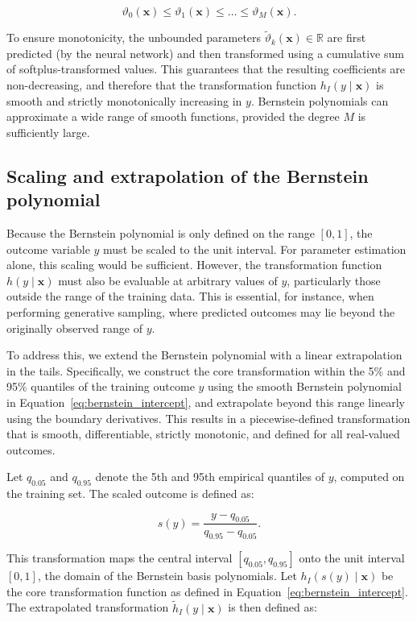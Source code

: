 \[
\vartheta_0(\mathbf{x}) \leq \vartheta_1(\mathbf{x}) \leq \dots \leq \vartheta_M(\mathbf{x}).
\]

To ensure monotonicity, the unbounded parameters $\tilde{\vartheta}_k(\mathbf{x}) \in \mathbb{R}$ are first predicted (by the neural network) and then transformed using a cumulative sum of softplus-transformed values. This guarantees that the resulting coefficients are non-decreasing, and therefore that the transformation function $h_I(y \mid \mathbf{x})$ is smooth and strictly monotonically increasing in $y$.
Bernstein polynomials can approximate a wide range of smooth functions, provided the degree $M$ is sufficiently large.



\subsection{Scaling and extrapolation of the Bernstein polynomial}

Because the Bernstein polynomial is only defined on the range $[0, 1]$, the outcome variable $y$ must be scaled to the unit interval. For parameter estimation alone, this scaling would be sufficient. However, the transformation function $h(y \mid \mathbf{x})$ must also be evaluable at arbitrary values of $y$, particularly those outside the range of the training data. This is essential, for instance, when performing generative sampling, where predicted outcomes may lie beyond the originally observed range of $y$.

To address this, we extend the Bernstein polynomial with a linear extrapolation in the tails. Specifically, we construct the core transformation within the 5\% and 95\% quantiles of the training outcome $y$ using the smooth Bernstein polynomial in Equation~\ref{eq:bernstein_intercept}, and extrapolate beyond this range linearly using the boundary derivatives. This results in a piecewise-defined transformation that is smooth, differentiable, strictly monotonic, and defined for all real-valued outcomes.

Let $q_{0.05}$ and $q_{0.95}$ denote the 5th and 95th empirical quantiles of $y$, computed on the training set. The scaled outcome is defined as:

\begin{equation}
s(y) = \frac{y - q_{0.05}}{q_{0.95} - q_{0.05}}.
\end{equation}

This transformation maps the central interval $[q_{0.05}, q_{0.95}]$ onto the unit interval $[0, 1]$, the domain of the Bernstein basis polynomials. Let $h_I(s(y) \mid \mathbf{x})$ be the core transformation function as defined in Equation~\eqref{eq:bernstein_intercept}. The extrapolated transformation $\tilde{h}_I(y \mid \mathbf{x})$ is then defined as:

